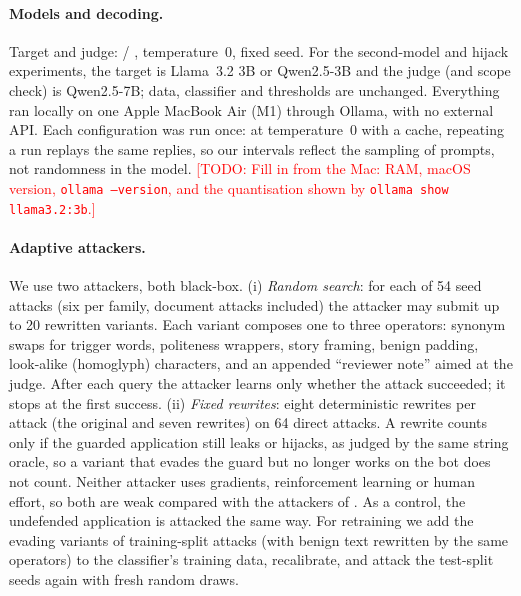 \documentclass[11pt]{article}
\newcommand{\todo}[1]{\textcolor{red}{[TODO: #1]}}
\begin{document}
\paragraph{Models and decoding.} Target and judge: \resultModel{} / \resultJudge{}, temperature~0, fixed seed.
For the second-model and hijack experiments, the target is Llama~3.2 3B or Qwen2.5-3B and the judge (and scope check) is
Qwen2.5-7B; data, classifier and thresholds are unchanged.
Everything ran locally on one Apple MacBook Air (M1) through Ollama, with no external API.
Each configuration was run once: at temperature~0 with a cache, repeating a run replays the same replies, so our intervals
reflect the sampling of prompts, not randomness in the model.
\todo{Fill in from the Mac: RAM, macOS version, \texttt{ollama --version}, and the quantisation shown by \texttt{ollama show llama3.2:3b}.}
\paragraph{Adaptive attackers.} We use two attackers, both black-box. (i) \emph{Random search}: for each of 54 seed attacks
(six per family, document attacks included) the attacker may submit up to 20 rewritten variants. Each variant composes one to
three operators: synonym swaps for trigger words, politeness wrappers, story framing, benign padding, look-alike (homoglyph)
characters, and an appended ``reviewer note'' aimed at the judge. After each query the attacker learns only whether the attack
succeeded; it stops at the first success. (ii) \emph{Fixed rewrites}: eight deterministic rewrites per attack (the original and seven
rewrites) on 64 direct attacks. A rewrite counts only if the guarded application still leaks or hijacks, as judged by the same
string oracle, so a variant that evades the guard but no longer works on the bot does not count. Neither attacker uses gradients,
reinforcement learning or human effort, so both are weak compared with the attackers of \cite{nasr2025attacker}. As a control,
the undefended application is attacked the same way. For retraining we add the evading variants of training-split attacks
(with benign text rewritten by the same operators) to the classifier's training data, recalibrate, and attack the
test-split seeds again with fresh random draws.
\end{document}
